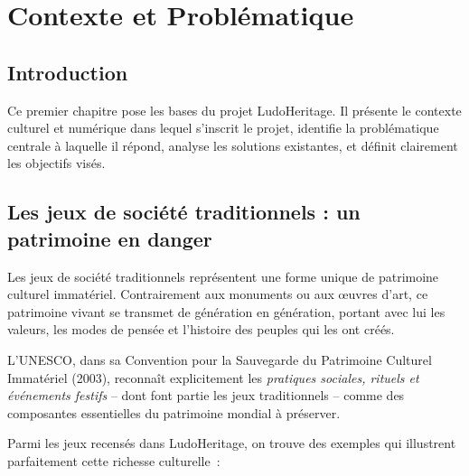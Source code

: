 \chapter{Contexte et Problématique}

\section{Introduction}

Ce premier chapitre pose les bases du projet LudoHeritage. Il présente le contexte culturel et
numérique dans lequel s'inscrit le projet, identifie la problématique centrale à laquelle il
répond, analyse les solutions existantes, et définit clairement les objectifs visés.

\section{Les jeux de société traditionnels : un patrimoine en danger}

Les jeux de société traditionnels représentent une forme unique de patrimoine culturel immatériel.
Contrairement aux monuments ou aux œuvres d'art, ce patrimoine \og{}vivant\fg{} se transmet de
génération en génération, portant avec lui les valeurs, les modes de pensée et l'histoire des
peuples qui les ont créés.

L'UNESCO, dans sa Convention pour la Sauvegarde du Patrimoine Culturel Immatériel (2003), reconnaît
explicitement les \textit{pratiques sociales, rituels et événements festifs} -- dont font partie les
jeux traditionnels -- comme des composantes essentielles du patrimoine mondial à préserver.

Parmi les jeux recensés dans LudoHeritage, on trouve des exemples qui illustrent parfaitement cette
richesse culturelle~:

